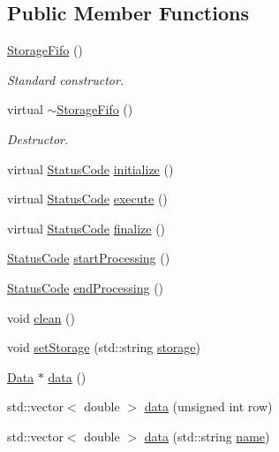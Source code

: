 \subsection*{Public Member Functions}
\begin{DoxyCompactItemize}
\item 
\hyperlink{classStorageFifo_a223700b2d5de3bd59ccf76df29f979d3}{Storage\+Fifo} ()
\begin{DoxyCompactList}\small\item\em Standard constructor. \end{DoxyCompactList}\item 
virtual \hyperlink{classStorageFifo_a5c464d5913f8857b54462f982bfa8ea3}{$\sim$\+Storage\+Fifo} ()
\begin{DoxyCompactList}\small\item\em Destructor. \end{DoxyCompactList}\item 
virtual \hyperlink{classStatusCode}{Status\+Code} \hyperlink{classStorageFifo_a568becd5cb8d0cb5307a39e0d27fb332}{initialize} ()
\item 
virtual \hyperlink{classStatusCode}{Status\+Code} \hyperlink{classStorageFifo_aa6826007c79ce353640fd1b1836807ff}{execute} ()
\item 
virtual \hyperlink{classStatusCode}{Status\+Code} \hyperlink{classStorageFifo_aaa04959087ffc774dbb713f9910c6c04}{finalize} ()
\item 
\hyperlink{classStatusCode}{Status\+Code} \hyperlink{classProcessus_a09319bde9bed93e290f69b4e04585543}{start\+Processing} ()
\item 
\hyperlink{classStatusCode}{Status\+Code} \hyperlink{classProcessus_a5e4da662989d356b89d490b89c7afbfd}{end\+Processing} ()
\item 
void \hyperlink{classProcessus_aaeb17673b98d2b39f3aa780e335e0968}{clean} ()
\item 
void \hyperlink{classProcessus_ad57a29b33f9021eda9f6929136f1784f}{set\+Storage} (std\+::string \hyperlink{classProcessus_a33fa1a0b54a636e5cdd680669fd9ea51}{storage})
\item 
\hyperlink{classData}{Data} $\ast$ \hyperlink{classProcessus_a16e45f329fbce935aeef0ff3cb508228}{data} ()
\item 
std\+::vector$<$ double $>$ \hyperlink{classProcessus_aa7c57483cf4b9ab0b2d0ae2de8316402}{data} (unsigned int row)
\item 
std\+::vector$<$ double $>$ \hyperlink{classProcessus_abf4d91fb36707e1d50178bab12d21ae9}{data} (std\+::string \hyperlink{classObject_a300f4c05dd468c7bb8b3c968868443c1}{name})

\end{DoxyCompactItemize}
